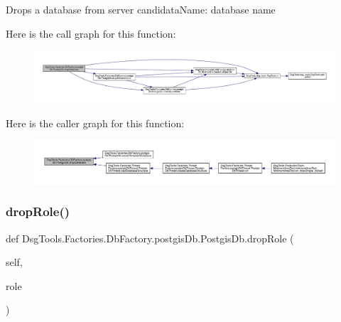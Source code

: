\begin{DoxyVerb}Drops a database from server
candidataName: database name
\end{DoxyVerb}
 Here is the call graph for this function\+:
\nopagebreak
\begin{figure}[H]
\begin{center}
\leavevmode
\includegraphics[width=350pt]{class_dsg_tools_1_1_factories_1_1_db_factory_1_1postgis_db_1_1_postgis_db_a806f1af3bf1bfc9c7fa5c4e322e0ef30_cgraph}
\end{center}
\end{figure}
Here is the caller graph for this function\+:
\nopagebreak
\begin{figure}[H]
\begin{center}
\leavevmode
\includegraphics[width=350pt]{class_dsg_tools_1_1_factories_1_1_db_factory_1_1postgis_db_1_1_postgis_db_a806f1af3bf1bfc9c7fa5c4e322e0ef30_icgraph}
\end{center}
\end{figure}
\mbox{\label{class_dsg_tools_1_1_factories_1_1_db_factory_1_1postgis_db_1_1_postgis_db_ac16f37ab02190784d2fcc3dab44bef43}} 
\subsubsection{\texorpdfstring{drop\+Role()}{dropRole()}}
{\footnotesize\ttfamily def Dsg\+Tools.\+Factories.\+Db\+Factory.\+postgis\+Db.\+Postgis\+Db.\+drop\+Role (\begin{DoxyParamCaption}\item[{}]{self,  }\item[{}]{role }\end{DoxyParamCaption})}


